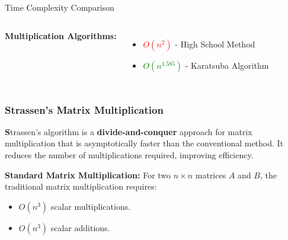 \begin{frame}{Time Complexity Comparison}

  \begin{columns}
      \textbf{Multiplication Algorithms:}
      \begin{itemize}
          \item \textcolor{red}{$O(n^2)$} - High School Method
          \item \textcolor{green}{$O(n^{1.585})$} - Karatsuba Algorithm
      \end{itemize}

  \end{columns}
\end{frame}

\begin{frame}
    \frametitle{Strassen's Matrix Multiplication}

    \textbf
    Strassen’s algorithm is a \textbf{divide-and-conquer} approach for matrix multiplication that is asymptotically faster than the conventional method. It reduces the number of multiplications required, improving efficiency.

    \vspace{0.5cm}
    \textbf{Standard Matrix Multiplication:}  
    For two \( n \times n \) matrices \( A \) and \( B \), the traditional matrix multiplication requires:
    
    \begin{itemize}
        \item \( O(n^3) \) scalar multiplications.
        \item \( O(n^3) \) scalar additions.
    \end{itemize}

\end{frame}

